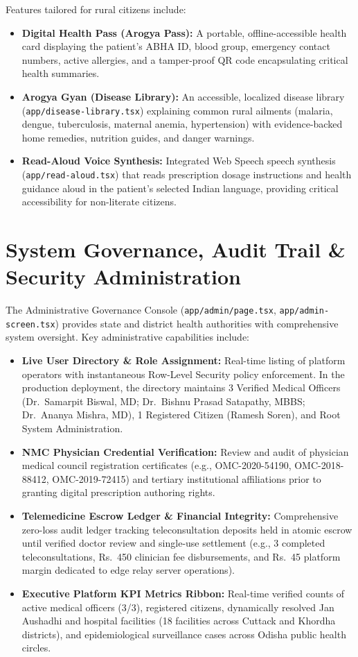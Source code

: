 \documentclass[12pt,a4paper,oneside]{report}
\begin{document}
Features tailored for rural citizens include:
\begin{itemize}[leftmargin=1.5em,itemsep=1pt,topsep=1pt,parsep=0pt]
    \item \textbf{Digital Health Pass (Arogya Pass):} A portable, offline-accessible health card displaying the patient's ABHA ID, blood group, emergency contact numbers, active allergies, and a tamper-proof QR code encapsulating critical health summaries.
    \item \textbf{Arogya Gyan (Disease Library):} An accessible, localized disease library (\texttt{app/disease-library.tsx}) explaining common rural ailments (malaria, dengue, tuberculosis, maternal anemia, hypertension) with evidence-backed home remedies, nutrition guides, and danger warnings.
    \item \textbf{Read-Aloud Voice Synthesis:} Integrated Web Speech speech synthesis (\texttt{app/read-aloud.tsx}) that reads prescription dosage instructions and health guidance aloud in the patient's selected Indian language, providing critical accessibility for non-literate citizens.
\end{itemize}

\section{System Governance, Audit Trail \& Security Administration}
The Administrative Governance Console (\texttt{app/admin/page.tsx}, \texttt{app/admin-screen.tsx}) provides state and district health authorities with comprehensive system oversight. Key administrative capabilities include:
\begin{itemize}[leftmargin=1.5em,itemsep=1pt,topsep=1pt,parsep=0pt]
    \item \textbf{Live User Directory \& Role Assignment:} Real-time listing of platform operators with instantaneous Row-Level Security policy enforcement. In the production deployment, the directory maintains 3 Verified Medical Officers (Dr.~Samarpit Biswal, MD; Dr.~Bishnu Prasad Satapathy, MBBS; Dr.~Ananya Mishra, MD), 1 Registered Citizen (Ramesh Soren), and Root System Administration.
    \item \textbf{NMC Physician Credential Verification:} Review and audit of physician medical council registration certificates (e.g., OMC-2020-54190, OMC-2018-88412, OMC-2019-72415) and tertiary institutional affiliations prior to granting digital prescription authoring rights.
    \item \textbf{Telemedicine Escrow Ledger \& Financial Integrity:} Comprehensive zero-loss audit ledger tracking teleconsultation deposits held in atomic escrow until verified doctor review and single-use settlement (e.g., 3 completed teleconsultations, Rs.~450 clinician fee disbursements, and Rs.~45 platform margin dedicated to edge relay server operations).
    \item \textbf{Executive Platform KPI Metrics Ribbon:} Real-time verified counts of active medical officers (3/3), registered citizens, dynamically resolved Jan Aushadhi and hospital facilities (18 facilities across Cuttack and Khordha districts), and epidemiological surveillance cases across Odisha public health circles.
\end{itemize}
\end{document}
